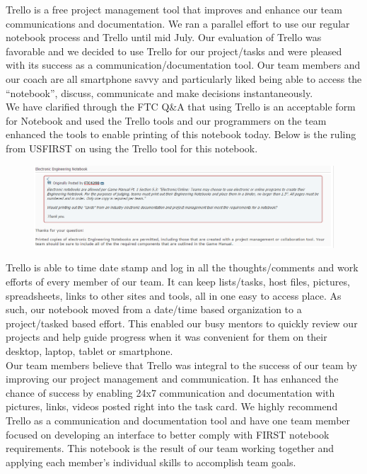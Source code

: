 Trello is a free project management tool that improves and enhance our team communications and documentation. We ran a parallel effort to use our regular notebook process and Trello until mid July. Our evaluation of Trello was favorable and we decided to use Trello for our project/tasks and were pleased with its success as a communication/documentation tool.  Our team members and our coach are all smartphone savvy and particularly liked being able to access the “notebook”, discuss, communicate and make decisions instantaneously.\\

We have clarified through the FTC Q\&A that using Trello is an acceptable form for Notebook and used the Trello tools and our programmers on the team enhanced the tools to enable printing of this notebook today.  Below is the ruling from USFIRST on using the Trello tool for this notebook.\\

\begin{figure}[H]
	\centering
	\includegraphics[width=\linewidth]{ruling}
	\label{fig:ruling}
\end{figure}

Trello is able to time date stamp and log in all the thoughts/comments and work efforts of every member of our team. It can keep lists/tasks, host files, pictures, spreadsheets, links to other sites and tools, all in one easy to access place. As such, our notebook moved from a date/time based organization to a project/tasked based effort.  This enabled our busy mentors to quickly review our projects and help guide progress when it was convenient for them on their desktop, laptop, tablet or smartphone.\\

Our team members believe that Trello was integral to the success of our team by improving our project management and communication.  It has enhanced the chance of success by enabling 24x7 communication and documentation with pictures, links, videos posted right into the task card. We highly recommend Trello as a communication and documentation tool and have one team member focused on developing an interface to better comply with FIRST notebook requirements.  This notebook is the result of our team working together and applying each member's individual skills to accomplish team goals.\\

